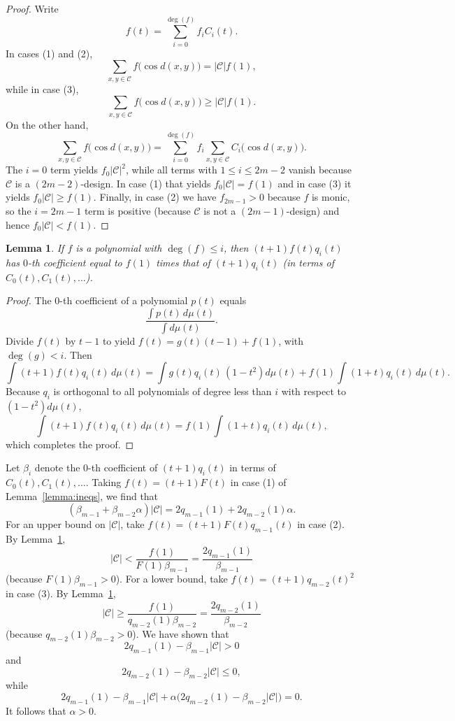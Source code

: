 \documentclass{jams-l}
\theoremstyle{plain}
\newtheorem{lemma}[theorem]{Lemma}
\numberwithin{theorem}{section}
\theoremstyle{definition}
\numberwithin{equation}{section}
\newcommand{\CodeS}{\mathcal{C}}
\begin{document}
\begin{proof}
Write
$$
f(t) = \sum_{i=0}^{\deg(f)} f_i C_i(t).
$$
In cases (1) and (2),
$$
\sum_{x,y \in \CodeS} f\big(\cos d(x,y) \big) = |\CodeS| f(1),
$$
while in case (3),
$$
\sum_{x,y \in \CodeS} f\big(\cos d(x,y) \big) \ge |\CodeS| f(1).
$$
On the other hand,
$$
\sum_{x,y \in \CodeS} f\big(\cos d(x,y) \big) =
\sum_{i=0}^{\deg(f)} f_i \sum_{x,y \in \CodeS} C_i\big(\cos
d(x,y)\big).
$$
The $i=0$ term yields $f_0 |\CodeS|^2$, while all terms with $1
\le i \le 2m-2$ vanish because $\CodeS$ is a $(2m-2)$-design.  In
case (1) that yields $f_0|\CodeS| = f(1)$ and in case (3) it
yields $f_0|\CodeS| \ge f(1)$.  Finally, in case (2) we have
$f_{2m-1}>0$ because $f$ is monic, so the $i=2m-1$ term is
positive (because $\CodeS$ is not a $(2m-1)$-design) and hence
$f_0|\CodeS| < f(1)$.
\end{proof}

\begin{lemma} \label{lemma:zerocoeff}
If $f$ is a polynomial with $\deg(f) \le i$, then
$(t+1)f(t)q_i(t)$ has $0$-th coefficient equal to $f(1)$ times
that of $(t+1)q_i(t)$ (in terms of $C_0(t),C_1(t),\dots$).
\end{lemma}

\begin{proof}
The $0$-th coefficient of a polynomial $p(t)$ equals
$$
\frac{\int p(t) \, d\mu(t)}{\int d\mu(t)}.
$$
Divide $f(t)$ by $t-1$ to yield $f(t) = g(t)(t-1) + f(1)$, with
$\deg(g) < i$.  Then
$$
\int (t+1)f(t)q_i(t) \, d\mu(t) = \int g(t) q_i(t) \,
(1-t^2)d\mu(t) + f(1) \int (1+t)q_i(t) \, d\mu(t).
$$
Because $q_i$ is orthogonal to all polynomials of degree less than
$i$ with respect to $(1-t^2)d\mu(t)$,
$$
\int (t+1)f(t)q_i(t) \, d\mu(t) = f(1) \int (1+t)q_i(t) \,
d\mu(t),
$$
which completes the proof.
\end{proof}

Let $\beta_i$ denote the $0$-th coefficient of $(t+1)q_{i}(t)$ in
terms of $C_0(t),C_1(t),\dots$. Taking $f(t) = (t+1)F(t)$ in case
(1) of Lemma~\ref{lemma:ineqs}, we find that
$$
(\beta_{m-1} + \beta_{m-2}\alpha)|\CodeS| = 2q_{m-1}(1) +
2q_{m-2}(1)\alpha.
$$
For an upper bound on $|\CodeS|$, take $f(t) =
(t+1)F(t)q_{m-1}(t)$ in case (2). By Lemma~\ref{lemma:zerocoeff},
$$
|\CodeS| < \frac{f(1)}{F(1)\beta_{m-1}} =
\frac{2q_{m-1}(1)}{\beta_{m-1}}
$$
(because $F(1)\beta_{m-1}>0$). For a lower bound, take $f(t) =
(t+1)q_{m-2}(t)^2$ in case (3). By Lemma~\ref{lemma:zerocoeff},
$$
|\CodeS| \ge \frac{f(1)}{q_{m-2}(1)\beta_{m-2}} =
\frac{2q_{m-2}(1)}{\beta_{m-2}}
$$
(because $q_{m-2}(1)\beta_{m-2}>0$).  We have shown that
$$
2q_{m-1}(1) - \beta_{m-1}|\CodeS| > 0
$$
and
$$
2q_{m-2}(1) - \beta_{m-2}|\CodeS| \le 0,
$$
while
$$
2q_{m-1}(1) - \beta_{m-1}|\CodeS| + \alpha \big(2q_{m-2}(1) -
\beta_{m-2}|\CodeS|\big) = 0.
$$
It follows that $\alpha>0$.
\end{document}
